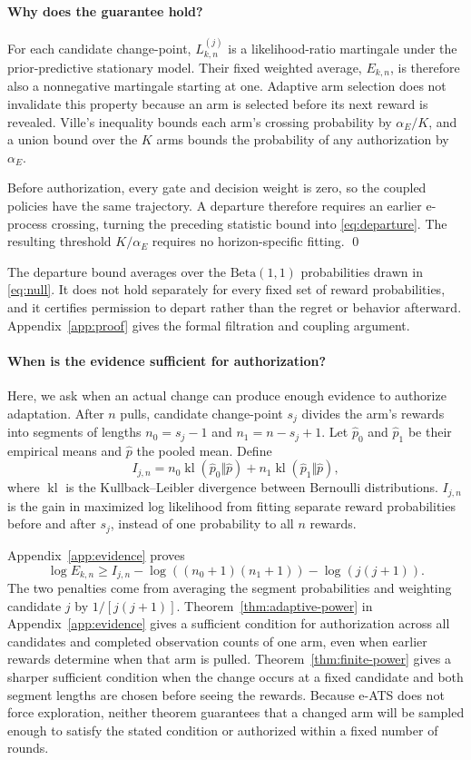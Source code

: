 \documentclass{article}
\newcommand{\method}{e-ATS}
\newcommand{\1}{\mathbf 1}
\newcommand{\kl}{\operatorname{kl}}
\newcommand{\alphaE}{\alpha_E}
\begin{document}
\paragraph{Why does the guarantee hold?}
For each candidate change-point, $L_{k,n}^{(j)}$ is a likelihood-ratio
martingale under the prior-predictive stationary model.
Their fixed weighted average, $E_{k,n}$, is therefore also a nonnegative martingale starting at one.
Adaptive arm selection does not invalidate this property because an arm is
selected before its next reward is revealed.
Ville's inequality bounds each arm's crossing probability by $\alphaE/K$, and a union bound over the $K$ arms bounds the probability of any authorization by $\alphaE$.

Before authorization, every gate and decision weight is zero, so the coupled
policies have the same trajectory. A departure therefore requires an earlier
e-process crossing, turning the preceding statistic bound into
\eqref{eq:departure}. The resulting threshold $K/\alphaE$ requires no
horizon-specific fitting. \qed

The departure bound averages over the $\mathrm{Beta}(1,1)$ probabilities drawn
in \eqref{eq:null}. It does not hold separately for every fixed set of reward
probabilities, and it certifies permission to depart rather than the regret or
behavior afterward. Appendix~\ref{app:proof} gives the formal filtration and
coupling argument.

\paragraph{When is the evidence sufficient for authorization?}

Here, we ask when an actual change can produce enough evidence to authorize adaptation.
After $n$ pulls, candidate change-point $s_j$ divides the arm's rewards into segments of lengths $n_0=s_j-1$ and $n_1=n-s_j+1$.
Let $\widehat p_0$ and $\widehat p_1$ be their empirical means and $\widehat p$ the pooled mean.
Define
\[
I_{j,n}
=
n_0\kl(\widehat p_0\Vert\widehat p)
+
n_1\kl(\widehat p_1\Vert\widehat p),
\]
where $\kl$ is the Kullback--Leibler divergence between Bernoulli
distributions. $I_{j,n}$ is the gain in maximized log likelihood from
fitting separate reward probabilities before and after $s_j$, instead of one
probability to all $n$ rewards.

Appendix~\ref{app:evidence} proves
\[
\log E_{k,n}
\ge
I_{j,n}
-\log((n_0+1)(n_1+1))
-\log(j(j+1)).
\]
The two penalties come from averaging the segment probabilities and weighting
candidate $j$ by $1/[j(j+1)]$.
Theorem~\ref{thm:adaptive-power} in Appendix~\ref{app:evidence} gives a sufficient
condition for authorization across all candidates and completed observation
counts of one arm, even when earlier rewards determine when that arm is pulled.
Theorem~\ref{thm:finite-power} gives a sharper sufficient condition when the change occurs
at a fixed candidate and both segment lengths are chosen before seeing the rewards.
Because \method{} does not force exploration, neither theorem guarantees that
a changed arm will be sampled enough to satisfy the stated condition
or authorized within a fixed number of rounds.
\end{document}
